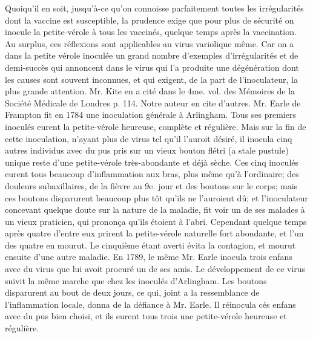 \setcounter{page}{272}
Quoiqu'il en soit, jusqu'à-ce qu'on connoisse parfaitement toutes les irrégularités dont la vaccine est susceptible, la prudence exige que pour plus de sécurité on inocule la petite-vérole à tous les vaccinés, quelque temps après la vaccination.
Au surplus, ces réflexions sont applicables\setcounter{page}{273} au virus variolique même. Car on a dans la petite vérole inoculée un grand nombre d'exemples d'irrégularités et de demi-succès qui annoncent dans le virus qui l'a produite une dégénération dont les causes sont souvent inconnues, et qui exigent, de la part de l'inoculateur, la plus grande attention. Mr. Kite en a cité dans le 4me. vol. des Mémoires de la Société Médicale de Londres p. 114. Notre auteur en cite d'autres. Mr. Earle de Frampton fit en 1784 une inoculation générale à Arlingham. Tous ses premiers inoculés eurent la petite-vérole heureuse, complète et régulière. Mais sur la fin de cette inoculation, n'ayant plus de virus tel qu'il l'auroit désiré, il inocula cinq autres individus avec du pus pris sur un vieux bouton flétri (a stale pustule) unique reste d'une petite-vérole très-abondante et déjà sèche. Ces cinq inoculés eurent tous beaucoup d'inflammation aux bras, plus même qu'à l'ordinaire; des douleurs subaxillaires, de la fièvre au 9e. jour et des boutons sur le corps; mais ces boutons disparurent beaucoup plus tôt qu'ils ne l'auroient dû; et l'inoculateur concevant quelque doute sur la nature de la maladie, fit voir un de ses malades à un vieux praticien, qui prononça qu'ils étoient à l'abri.\setcounter{page}{274} Cependant quelque temps après quatre d'entre eux prirent la petite-vérole naturelle fort abondante, et l'un des quatre en mourut. Le cinquième étant averti évita la contagion, et mourut ensuite d'une autre maladie. En 1789, le même Mr. Earle inocula trois enfans avec du virus que lui avoit procuré un de ses amis. Le développement de ce virus suivit la même marche que chez les inoculés d'Arlingham. Les boutons disparurent au bout de deux jours, ce qui, joint a la ressemblance de l'inflammation locale, donna de la défiance à Mr. Earle. Il réinocula cés enfans avec du pus bien choisi, et ils eurent tous trois une petite-vérole heureuse et régulière.
